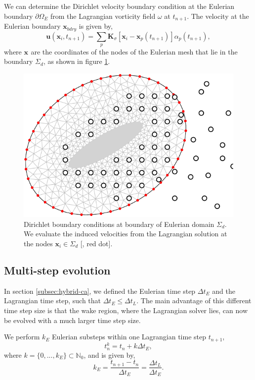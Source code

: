 We can determine the Dirichlet velocity boundary condition at the Eulerian boundary $\partial \Omega_E$ from the Lagrangian vorticity field $\omega$ at $t_{n+1}$. The velocity at the Eulerian boundary $\mathbf{x}_{bdry}$ is given by,
\begin{equation}
\mathbf{u}(\mathbf{x}_{i},t_{n+1}) = \sum_p \mathbf{K}_{\sigma}[\mathbf{x}_{i} - \mathbf{x}_p(t_{n+1})]\alpha_p(t_{n+1}),
\end{equation}
where $\mathbf{x}_{}$ are the coordinates of the nodes of the Eulerian mesh that lie in the boundary $\Sigma_d$, as shown in figure \ref{fig:eulerianDirichletBC2}.

	\begin{figure}[!h]
	\centering
	\includegraphics[width=0.5\linewidth]{./figures/hybrid/dirichlet/eulerianDirichletBC-crop.pdf}
	\caption{Dirichlet boundary conditions at boundary of Eulerian domain $\Sigma_d$. We evaluate the induced velocities from the Lagrangian solution at the nodes $\mathbf{x}_i\in\Sigma_d$ [{\color{plotRed}{$\bullet$}}, red dot].}
	\label{fig:eulerianDirichletBC2}
	\end{figure}	


\subsection{Multi-step evolution}
\label{subsec:mse2}
In section \ref{subsec:hybrid-ca}, we defined the Eulerian time step $\Delta t_E$ and the Lagrangian time step, such that $\Delta t_E \leqslant \Delta t_L$. The main advantage of this different time step size is that the wake region, where the Lagrangian solver lies, can now be evolved with a much larger time step size.

We perform $k_E$ Eulerian substeps within one Lagrangian time step $t_{n+1}$,
\begin{equation}
t_n^k = t_n + k\Delta t_E,
\end{equation}
where $k = \{0,...,k_E\} \subset \mathbb{N}_0$, and is given by,
\begin{equation}
k_E = \frac{t_{n+1}-t_{n}}{\Delta t_E} = \frac{\Delta t_L}{\Delta t_E}.
\label{eq:timeStepDependency2}
\end{equation}

